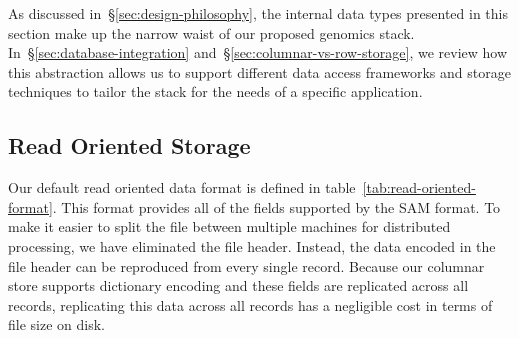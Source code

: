 \documentclass[10pt,twocolumn]{article}
\theoremstyle{plain}
\begin{document}
As discussed in~\S\ref{sec:design-philosophy}, the internal data types presented in this section make up the narrow waist of our
proposed genomics stack. In~\S\ref{sec:database-integration} and~\S\ref{sec:columnar-vs-row-storage}, we review how this
abstraction allows us to support different data access frameworks and storage techniques to tailor the stack for the needs of
a specific application.

\subsection{Read Oriented Storage}
\label{sec:read-oriented-storage}

Our default read oriented data format is defined in table~\ref{tab:read-oriented-format}. This format provides all of the
fields supported by the SAM format. To make it easier to split the file between multiple machines for distributed processing,
we have eliminated the file header. Instead, the data encoded in the file header can be reproduced from every single
record. Because our columnar store supports dictionary encoding and these fields are replicated across all records,
replicating this data across all records has a negligible cost in terms of file size on disk.
\end{document}
